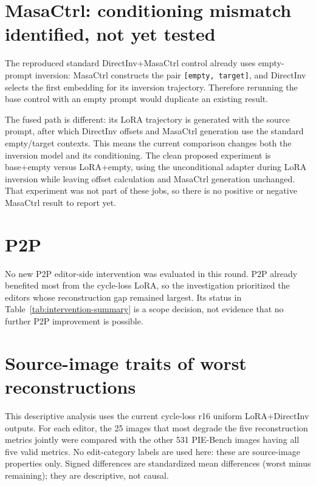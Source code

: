 \documentclass[10pt]{article}
\begin{document}
\section*{MasaCtrl: conditioning mismatch identified, not yet tested}

The reproduced standard DirectInv+MasaCtrl control already uses empty-prompt
inversion: MasaCtrl constructs the pair \texttt{[empty, target]}, and
DirectInv selects the first embedding for its inversion trajectory. Therefore
rerunning the base control with an empty prompt would duplicate an existing
result.

The fused path is different: its LoRA trajectory is generated with the source
prompt, after which DirectInv offsets and MasaCtrl generation use the standard
empty/target contexts. This means the current comparison changes both the
inversion model and its conditioning. The clean proposed experiment is
base+empty versus LoRA+empty, using the unconditional adapter during LoRA
inversion while leaving offset calculation and MasaCtrl generation unchanged.
That experiment was not part of these jobs, so there is no positive or negative
MasaCtrl result to report yet.

\section*{P2P}

No new P2P editor-side intervention was evaluated in this round. P2P already
benefited most from the cycle-loss LoRA, so the investigation prioritized the
editors whose reconstruction gap remained largest. Its status in
Table~\ref{tab:intervention-summary} is a scope decision, not evidence that no
further P2P improvement is possible.

\section*{Source-image traits of worst reconstructions}

This descriptive analysis uses the current cycle-loss r16 uniform
LoRA+DirectInv outputs. For each editor, the 25 images that most degrade the
five reconstruction metrics jointly were compared with the other 531 PIE-Bench
images having all five valid metrics. No edit-category labels are used here:
these are source-image properties only. Signed differences are standardized
mean differences (worst minus remaining); they are descriptive, not causal.
\end{document}
